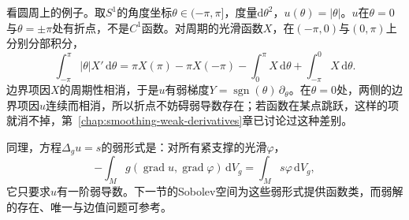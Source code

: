 看圆周上的例子。取$S^1$的角度坐标$\theta\in(-\pi,\pi]$，度量$\mathrm d\theta^2$，$u(\theta)=\lvert\theta\rvert$。$u$在$\theta=0$与$\theta=\pm\pi$处有折点，不是$C^1$函数。对周期的光滑函数$X$，在$(-\pi,0)$与$(0,\pi)$上分别分部积分，
\[
\int_{-\pi}^{\pi}\lvert\theta\rvert X'\,\mathrm d\theta=\pi X(\pi)-\pi X(-\pi)-\int_0^\pi X\,\mathrm d\theta+\int_{-\pi}^0X\,\mathrm d\theta .
\]
边界项因$X$的周期性相消，于是$u$有弱梯度$Y=\operatorname{sgn}(\theta)\,\partial_\theta$。在$\theta=0$处，两侧的边界项因$u$连续而相消，所以折点不妨碍弱导数存在；若函数在某点跳跃，这样的项就消不掉，第~\ref{chap:smoothing-weak-derivatives}章已讨论过这种差别。

同理，方程$\Delta_gu=s$的弱形式是：对所有紧支撑的光滑$\varphi$，
\begin{equation}
-\int_Mg(\operatorname{grad}u,\operatorname{grad}\varphi)\,\mathrm dV_g=\int_Ms\varphi\,\mathrm dV_g ,
\label{eq:mcalc-weak-laplace}
\end{equation}
它只要求$u$有一阶弱导数。下一节的Sobolev空间为这些弱形式提供函数类，而弱解的存在、唯一与边值问题可参考。
